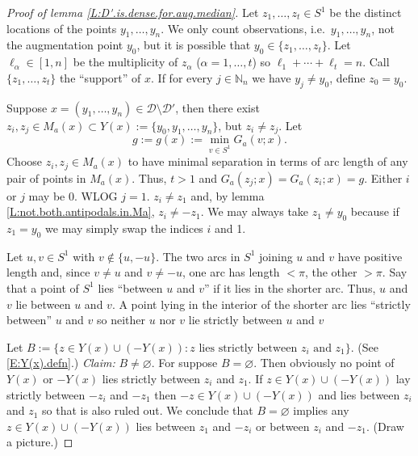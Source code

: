 \documentclass[10pt,a4paper]{amsart}
\newcommand{\D}{\mathcal{D}}
\newcommand{\NN}{\mathbb{N}}
\begin{document}
  \begin{proof}[Proof of lemma \ref{L:D'.is.dense.for.aug.median}]
Let $z_{1}, \ldots, z_{t} \in S^{1}$ be the distinct locations of the points 
$y_{1}, \ldots, y_{n}$. We only count observations, i.e.\ $y_{1}, \ldots, y_{n}$, not the augmentation point $y_{0}$, but it is possible that 
$y_{0} \in \{ z_{1}, \ldots, z_{t} \}$. 
Let $\ell_{\alpha} \in [1,n]$ be the multiplicity 
of $z_{\alpha}$ ($\alpha=1, \ldots, t$) 
so $\ell_{1} + \cdots + \ell_{t} = n$. Call $\{ z_{1}, \ldots, z_{t} \}$ the ``support'' of $x$. 
If for every $j \in \NN_{n}$ we have $y_{j} \neq y_{0}$, define $z_{0} = y_{0}$. 

Suppose $x = ( y_{1}, \ldots, y_{n} ) \in \D \setminus \D'$, 
then there exist $z_{i}, z_{j} \in M_{a}(x) \subset Y(x)  := \{ y_{0}, y_{1}, \ldots, y_{n} \}$,
but $z_{i} \neq z_{j}$. Let 
    \begin{equation*}
      g := g(x) := \min_{v \in S^{1}} G_{a}(v;x) . 
    \end{equation*}
Choose $z_{i}, z_{j} \in M_{a}(x)$ to have minimal separation in terms of arc length of any pair of points in $M_{a}(x)$. Thus, $t > 1$ and $G_{a}(z_{j};x) = G_{a}(z_{i};x) = g$. Either $i$ or $j$ may be 0. WLOG $j = 1$. $z_{i} \neq z_{1}$ and, by lemma \ref{L:not.both.antipodals.in.Ma}, $z_{i} \neq -z_{1}$. We may always take 
$z_{1} \neq y_{0}$ because if $z_{1} = y_{0}$ we may simply swap the indices $i$ and 1.

Let $u, v \in S^{1}$ with $v \notin \{u,-u\}$. The two arcs in $S^{1}$ joining $u$ and $v$ have positive length and, since $v \neq u$ and $v \neq -u$, one arc has length $< \pi$, the other $> \pi$. Say that a point of $S^{1}$ lies ``between $u$ and $v$'' if it lies in the shorter arc. Thus, $u$ and $v$ lie between $u$ and $v$. A point lying in the interior of the shorter arc lies ``strictly between'' $u$ and $v$ so neither $u$ nor $v$ lie strictly between $u$ and $v$

Let 
$B := \bigl\{ z \in Y(x) \cup (-Y(x)) : z \text{ lies strictly between } z_{i} \text{ and } z_{1} \bigr\}$. (See \eqref{E:Y(x).defn}.) \emph{Claim:} $B \neq \varnothing$. 
For suppose $B = \varnothing$. Then obviously no point of $Y(x)$ or $-Y(x)$ lies strictly between $z_{i}$ and $z_{1}$. If $z \in Y(x) \cup (-Y(x))$ lay strictly between $-z_{i}$ and $-z_{1}$ then $-z \in Y(x) \cup (-Y(x))$ and lies between $z_{i}$ and $z_{1}$ so that is also ruled out. We conclude that 
$B = \varnothing$ implies any $z \in Y(x) \cup (-Y(x))$ lies between $z_{1}$ and $-z_{i}$ or between $z_{i}$ and $-z_{1}$. (Draw a picture.)


\end{proof}
\end{document}
